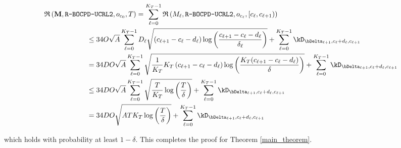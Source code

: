 \documentclass{article} %
\begin{document}
\begin{align}
    \mathfrak{R} \left(\mathbf{M}, \texttt{R-BOCPD-UCRL2}, o_{c_0}, T\right) & = \sum\limits_{\ell=0}^{K_T-1} \mathfrak{R} \left(M_\ell, \texttt{R-BOCPD-UCRL2}, o_{c_\ell}, \left[c_\ell, c_{\ell+1}\right) \right) \nonumber \\
    & \hspace{-70pt} \leq 34 O \sqrt{A} \sum\limits_{\ell=0}^{K_T-1} D_\ell \sqrt{\left(c_{\ell+1}-c_{\ell}-d_{\ell} \right) \log\left(\frac{c_{\ell+1}-c_{\ell}-d_{\ell}}{\delta_\ell} \right)} + \sum\limits_{\ell=0}^{K_T-1} \kD_{\bDelta_{\ell+1},c_{\ell}+d_{\ell},c_{\ell+1}} \nonumber \\
    & \hspace{-70pt} = 34 D O \sqrt{A} \sum\limits_{\ell=0}^{K_T-1} \sqrt{\frac{1}{K_T} K_T \left(c_{\ell+1}-c_{\ell}-d_{\ell} \right) \log\left (\frac{K_T  (c_{\ell+1}-c_{\ell}-d_{\ell})}{\delta} \right)} + \sum\limits_{\ell=0}^{K_T-1} \kD_{\bDelta_{\ell+1},c_{\ell}+d_{\ell},c_{\ell+1}} \nonumber \\
    & \hspace{-70pt} \leq 34 D O \sqrt{A} \sum\limits_{\ell=0}^{K_T-1} \sqrt{\frac{T}{K_T} \log\left (\frac{T}{\delta} \right)} + \sum\limits_{\ell=0}^{K_T-1} \kD_{\bDelta_{\ell+1},c_{\ell}+d_{\ell},c_{\ell+1}} \nonumber \\
    & \hspace{-70pt} = 34 D O \sqrt{A T K_T \log\left (\frac{T}{\delta} \right)} + \sum\limits_{\ell=0}^{K_T-1} \kD_{\bDelta_{\ell+1},c_{\ell}+d_{\ell},c_{\ell+1}} \label{eq::ft-regret}
\end{align}

which holds with probability at least $1-\delta$. This completes the proof for Theorem \ref{main_theorem}.\\ 

\end{document}
